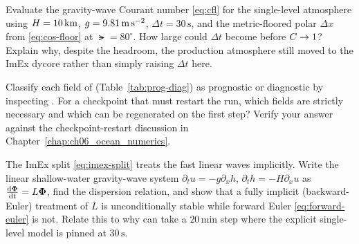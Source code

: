 \begin{exercise}
Evaluate the gravity-wave Courant number \eqref{eq:cfl} for the single-level atmosphere using
$H=10\,\mathrm{km}$, $g=9.81\,\mathrm{m\,s^{-2}}$, $\Delta t=30\,\mathrm{s}$, and the
metric-floored polar $\Delta x$ from \eqref{eq:cos-floor} at $\lat=80^\circ$. How large could
$\Delta t$ become before $C\to1$? Explain why, despite the headroom, the production atmosphere
still moved to the ImEx \dino{} dycore rather than simply raising $\Delta t$ here.
\end{exercise}

\begin{exercise}
Classify each field of  (Table~\ref{tab:prog-diag}) as prognostic or diagnostic
by inspecting . For a checkpoint that must restart the run, which fields are
strictly necessary and which can be regenerated on the first step? Verify your answer against the
checkpoint-restart discussion in Chapter~\ref{chap:ch06_ocean_numerics}.
\end{exercise}

\begin{exercise}
The ImEx split \eqref{eq:imex-split} treats the fast linear waves implicitly. Write the linear
shallow-water gravity-wave system $\partial_t u=-g\partial_x h$, $\partial_t h=-H\partial_x u$ as
$\frac{\mathrm{d}\boldsymbol\Phi}{\mathrm{d}t}=L\boldsymbol\Phi$, find the dispersion relation, and show that a fully
implicit (backward-Euler) treatment of $L$ is unconditionally stable while forward Euler
\eqref{eq:forward-euler} is not. Relate this to why \dino{} can take a $20\,\mathrm{min}$ step
where the explicit single-level model is pinned at $30\,\mathrm{s}$.
\end{exercise}
